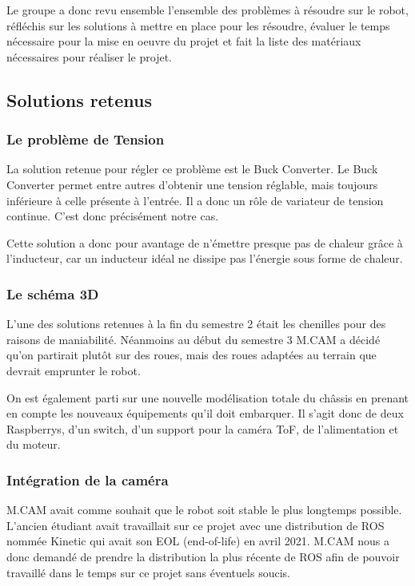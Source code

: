 Le groupe a donc revu ensemble l'ensemble des problèmes à résoudre sur le robot, réfléchis sur les solutions à mettre en place pour les résoudre, évaluer le temps nécessaire pour la mise en oeuvre du projet et fait la liste des matériaux nécessaires pour réaliser le projet.


\subsection{Solutions retenus}

\subsubsection{Le problème de Tension}

La solution retenue pour régler ce problème est le Buck Converter. Le Buck Converter permet entre autres d’obtenir une tension réglable, mais toujours inférieure à celle présente à l’entrée. Il a donc un rôle de variateur de tension continue. C’est donc précisément notre cas.

Cette solution a donc pour avantage de n’émettre presque pas de chaleur grâce à l’inducteur, car un inducteur idéal ne dissipe pas l’énergie sous forme de chaleur.

\subsubsection{Le schéma 3D}

L’une des solutions retenues à la fin du semestre 2  était les chenilles pour des raisons de maniabilité. 
Néanmoins au début du semestre 3 M.CAM a décidé qu’on partirait plutôt sur des roues, mais des roues adaptées au terrain que devrait emprunter le robot.

On est également parti sur une nouvelle modélisation totale du châssis en prenant en compte les nouveaux équipements qu’il doit embarquer. Il s’agit donc de deux Raspberrys, d’un switch, d’un support pour la caméra ToF, de l’alimentation et du moteur. 

\subsubsection{Intégration de la caméra}

M.CAM avait comme souhait que le robot soit stable le plus longtemps possible. L'ancien étudiant avait travaillait sur ce projet avec une distribution de ROS nommée Kinetic qui avait son EOL (end-of-life) en avril 2021. M.CAM nous a donc demandé de prendre la distribution la plus récente de ROS afin de pouvoir travaillé dans le temps sur ce projet sans éventuels soucis.

